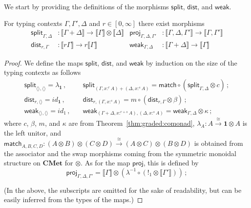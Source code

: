 \documentclass[a4paper,UKenglish,cleveref, autoref, thm-restate]{lipics-v2021}
\newcommand{\cat}[1]{\mathbf{#1}}
\newcommand{\CMet}{\cat{CMet}}
\newcommand{\mprod}{\otimes}
\newcommand{\unit}{\mathbf{1}}
\newcommand{\extpreals}{[0,\infty]}
\newcommand{\emptyctx}{\langle\rangle}
\newcommand{\scaling}{}
\newcommand{\iso}{\cong}
\newcommand{\splt}{\mathsf{split}}
\newcommand{\distribute}{\mathsf{dist}}
\newcommand{\proj}{\mathsf{proj}}
\newcommand{\semweak}{\mathsf{weak}}
\newcommand{\den}[1]{\llbracket #1\rrbracket}
\newcommand{\asmap}{\beta} %
\begin{document}
We start by providing the definitions of the morphisms $\splt$, $\distribute$, and $\semweak$.
\begin{proposition}
For typing contexts $\Gamma,\Gamma',\Delta$ and $r \in \extpreals$ 
there exist morphisms %
\begin{align*}
\splt_{\Gamma,\Delta} &\colon \den{\Gamma+\Delta} 
    \to \den{\Gamma} \mprod \den{\Delta}
&
\proj_{\Gamma,\Delta,\Gamma'} &\colon \den{\Gamma,\Delta,\Gamma'} 
    \to \den{\Gamma,\Gamma'}
\\
\distribute_{r,\Gamma} &\colon \den{r\scaling\Gamma}
    \to r\scaling\den{\Gamma}
&
\semweak_{\Gamma,\Delta} &\colon \den{\Gamma+\Delta} 
    \to \den{\Gamma}
\end{align*}
\end{proposition}
\begin{proof}
We define the maps $\splt$, $\distribute$, and $\semweak$ by induction on the size of the typing contexts as follows
\begin{align*}
\splt_{\emptyctx,\emptyctx} = \lambda_\unit \,, &\quad
\splt_{(\Gamma, x:^rA)+(\Delta,x:^sA)} = \mathsf{match} \circ 
    (\splt_{\Gamma,\Delta} \mprod c) \,;
\\
\distribute_{r,\emptyctx} = id_{\unit} \,, &\quad
\distribute_{r,(\Gamma,x:^sA)} =  m \circ (\distribute_{r,\Gamma} \mprod \asmap) \,;
\\
\semweak_{\emptyctx,\emptyctx} = id_1 \,, &\quad
\semweak_{(\Gamma+\Delta, x:^{r+s}A),(\Delta,x:^sA)} =  
    \semweak_{\Gamma,\Delta} \mprod \kappa \,;
\end{align*}
where $c$, $\asmap$, $m$, and $\kappa$ are from
Theorem~\ref{thm:graded:comonad}, $\lambda_A \colon A \xrightarrow{\iso} \unit \mprod A$ is the left unitor, and $\mathsf{match}_{A,B,C,D} \colon (A \mprod B)\mprod (C \mprod D) \xrightarrow{\iso} (A \mprod C)\mprod (B \mprod D)$ is obtained from the associator and the swap morphisms coming from
the symmetric monoidal structure on $\CMet$ for $\mprod$.
As for the map $\proj$, this is defined by
\[
\proj_{\Gamma,\Delta,\Gamma'} = \den\Gamma\mprod ( \lambda^{-1} \circ ({!_1}\mprod\den{\Gamma'}))  \,;
\]


(In the above, the subscripts are omitted for the sake of readability, but can be easily
inferred from the types of the maps.)
\end{proof}
\end{document}
